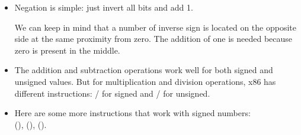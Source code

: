\begin{itemize}
\label{sec:signednumbers:negation}
\item Negation is simple: just invert all bits and add 1.

We can keep in mind that a number of inverse sign is located on the opposite side at the same proximity from zero.
The addition of one is needed because zero is present in the middle.

\item 
	The addition and subtraction operations work well for both signed and unsigned values.
	But for multiplication and division operations, x86 has different instructions:
	/ for signed and / for unsigned.
\item
	Here are some more instructions that work with signed numbers:\\
	 (),  (),  ().
\end{itemize}




